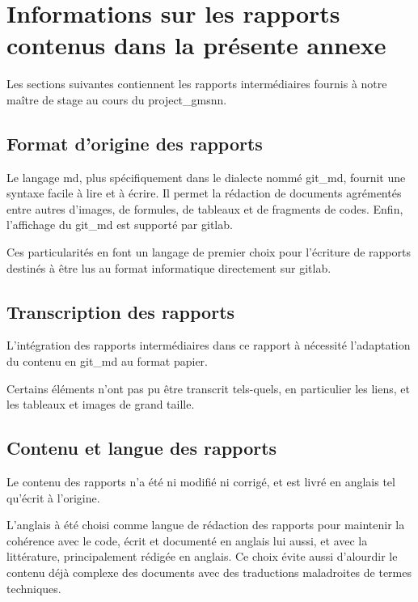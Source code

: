 
\section{Informations sur les rapports contenus dans la présente annexe} \label{report_infos}
Les sections suivantes contiennent les rapports intermédiaires fournis à notre maître de stage au cours du \gls{project_gmsnn}.

\subsection{Format d'origine des rapports}
Le langage \gls{md}, plus spécifiquement dans le dialecte nommé \gls{git_md}, fournit une syntaxe facile à lire et à écrire.%
Il permet la rédaction de documents agrémentés entre autres d'images, de formules, de tableaux et de fragments de codes.
Enfin, l'affichage du \gls{git_md} est supporté par \gls{gitlab}. %

Ces particularités en font un langage de premier choix pour l'écriture de rapports destinés à être lus au format informatique directement sur \gls{gitlab}.

\subsection{Transcription des rapports}
L'intégration des rapports intermédiaires dans ce rapport à nécessité l'adaptation du contenu en \gls{git_md} au format papier.

Certains éléments n'ont pas pu être transcrit tels-quels, en particulier les liens, et les tableaux et images de grand taille.

\subsection{Contenu et langue des rapports}
Le contenu des rapports n'a été ni modifié ni corrigé, et est livré en anglais tel qu'écrit à l'origine.

L'anglais à été choisi comme langue de rédaction des rapports pour maintenir la cohérence avec le code, écrit et documenté en anglais lui aussi, et avec la littérature, principalement rédigée en anglais.
Ce choix évite aussi d'alourdir le contenu déjà complexe des documents avec des traductions maladroites de termes techniques. %

